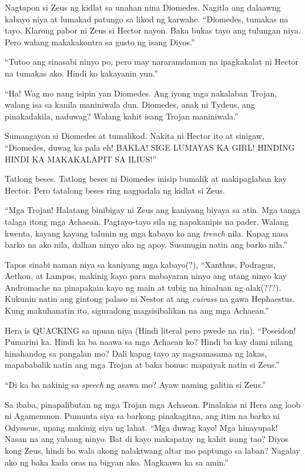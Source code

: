 \documentclass[12pt,letterpaper]{report}
\begin{document}
Nagtapon si Zeus ng kidlat sa unahan nina Diomedes. Nagitla ang dalaawng kabayo niya at lumakad patungo sa likod ng karwahe. ``Diomedes, tumakas na tayo. Klarong pabor ni Zeus si Hector nayon. Baka bukas tayo ang tulungan niya. Pero walang makakakontra sa gusto ng isang Diyos.''

``Tutoo ang sinasabi ninyo po, pero may nararamdaman na ipagkakalat ni Hector na tumakas ako. Hindi ko kakayanin yun.''

``Ha! Wag mo nang isipin yan Diomedes. Ang iyong mga nakalaban Trojan, walang isa sa kanila maniniwala dun. Diomedes, anak ni Tydeus, ang pinakadakila, naduwag? Walang kahit isang Trojan maniniwala.''

Sumangayon si Diomedes at tumalikod. Nakita ni Hector ito at sinigaw, ``Diomedes, duwag ka pala eh! BAKLA! SIGE LUMAYAS KA GIRL! HINDING HINDI KA MAKAKALAPIT SA ILIUS!''

Tatlong beses. Tatlong beses ni Diomedes inisip bumalik at makipaglaban kay Hector. Pero tatalong beses ring nagpadala ng kidlat si Zeus.

``Mga Trojan! Halatang binibigay ni Zeus ang kaniyang biyaya sa atin. Mga tanga talaga itong mga Achaean. Pagtayo-tayo sila ng napakanipis na pader. Walang kwenta, kayang kayang talunin ng mga kabayo ko ang \textit{trench} nila. Kapag nasa barko na ako nila, dalhan ninyo ako ng apoy. Susunugin natin ang barko nila.''

Tapos sinabi naman niya sa kaniyang mga kabayo(?), ``Xanthus, Podragus, Aethon, at Lampus, makinig kayo para mabayaran ninyo ang utang ninyo kay Andromache na pinapakain kayo ng main at tubig na hinaluan ng alak(???). Kukunin natin ang gintong palaso ni Nestor at ang \textit{cuirass} na gawa Hephaestus. Kung makuhanatin ito, siguradong magsisibalikan na ang mga Achaean.''

Hera is QUACKING sa upuan niya (Hindi literal pero pwede na rin). ``Poseidon! Pumarini ka. Hindi ka ba naawa sa mga Achaean ko? Hindi ba kay dami nilang hinahandog sa pangalan mo? Dali kapag tayo ay nagsamasama ng lakas, mapababalik natin ang mga Trojan at baka bonus: mapaiyak natin si Zeus.''

``Di ka ba nakinig sa \textit{speech} ng asawa mo? Ayaw naming galitin si Zeus.''

Sa ibaba, pinapalibutan ng mga Trojan mga Achaean. Pinalakas ni Hera ang loob ni Agamemnon. Pumunta siya sa barkong pinakagitna, ang itim na barko ni Odysseus, upang makinig siya ng lahat. ``Mga duwag kayo! Mga hinayupak! Nasan na ang yabang ninyo. Bat di kayo makapatay ng kahit isang tao? Diyos kong Zeus, hindi ba wala akong nalaktwang altar mo paptungo sa laban? Nagalay ako ng baka kada oras na bigyan ako. Magkaawa ka sa amin.''
\end{document}
